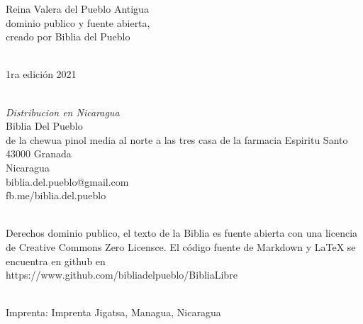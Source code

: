 \hfill\break
Reina Valera del Pueblo Antigua\\
dominio publico y fuente abierta,\\
creado por Biblia del Pueblo\\
\strut \\
1ra edición 2021\\
\strut \\
\emph{Distribucion en Nicaragua}\\
Biblia Del Pueblo\\
de la chewua pinol media al norte a las tres casa de la farmacia
Espiritu Santo\\
43000 Granada\\
Nicaragua\\
biblia.del.pueblo@gmail.com\\
fb.me/biblia.del.pueblo\\
\strut \\
Derechos dominio publico, el texto de la Biblia es fuente abierta con
una licencia de Creative Commons Zero Licensce. El código fuente de
Markdown y LaTeX se encuentra en github en\\
https://www.github.com/bibliadelpueblo/BibliaLibre\\
\strut \\
Imprenta: Imprenta Jigatsa, Managua, Nicaragua\\
